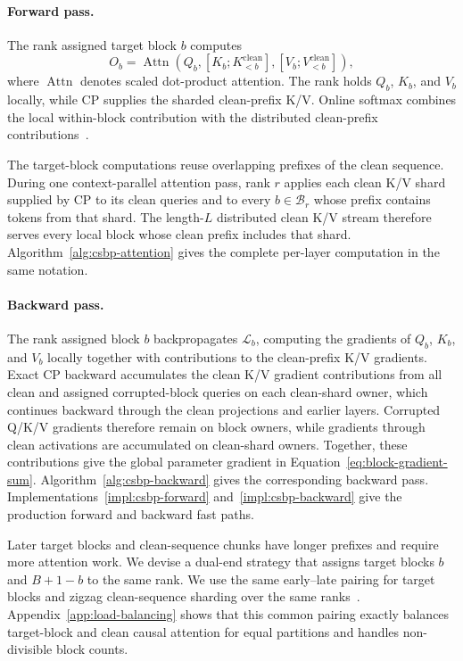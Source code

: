 \paragraph{Forward pass.}
The rank assigned target block $b$ computes
\begin{equation}
    O_b
    =
    \operatorname{Attn}\!\left(
        Q_b,
        [K_b;K_{<b}^{\mathrm{clean}}],
        [V_b;V_{<b}^{\mathrm{clean}}]
    \right),
    \label{eq:csbp-block-attention}
\end{equation}
where $\operatorname{Attn}$ denotes scaled dot-product attention. The rank
holds $Q_b$, $K_b$, and $V_b$ locally, while CP supplies the sharded
clean-prefix K/V. Online softmax combines the local within-block contribution
with the distributed clean-prefix
contributions~\citep{milakov2018online,dao2022flashattention}.

The target-block computations reuse overlapping prefixes of the clean
sequence. During one context-parallel attention pass, rank $r$ applies each
clean K/V shard supplied by CP to its clean queries and to every
$b\in\mathcal{B}_r$ whose prefix contains tokens from that shard. The
length-$L$ distributed clean K/V stream therefore serves every local block
whose clean prefix includes that shard. Algorithm~\ref{alg:csbp-attention}
gives the complete per-layer computation in the same notation.

\paragraph{Backward pass.}
The rank assigned block $b$ backpropagates $\mathcal{L}_b$, computing the
gradients of $Q_b$, $K_b$, and $V_b$ locally together with contributions to
the clean-prefix K/V gradients. Exact CP backward accumulates the clean K/V
gradient contributions from all clean and assigned corrupted-block queries on
each clean-shard owner, which continues backward through the clean projections
and earlier layers. Corrupted Q/K/V gradients therefore remain on block owners,
while gradients through clean activations are accumulated on clean-shard
owners. Together, these contributions give the global parameter gradient in
Equation~\ref{eq:block-gradient-sum}. Algorithm~\ref{alg:csbp-backward}
gives the corresponding backward pass. Implementations~\ref{impl:csbp-forward}
and~\ref{impl:csbp-backward} give the production forward and backward fast
paths.

Later target blocks and clean-sequence chunks have longer prefixes and require
more attention work. We devise a dual-end strategy that assigns target blocks
$b$ and $B+1-b$ to the same rank. We use the same early--late pairing for
target blocks and zigzag clean-sequence sharding over the same
ranks~\citep{dubey2024llama3}. Appendix~\ref{app:load-balancing} shows that this
common pairing exactly balances target-block and clean causal attention for
equal partitions and handles non-divisible block counts.

